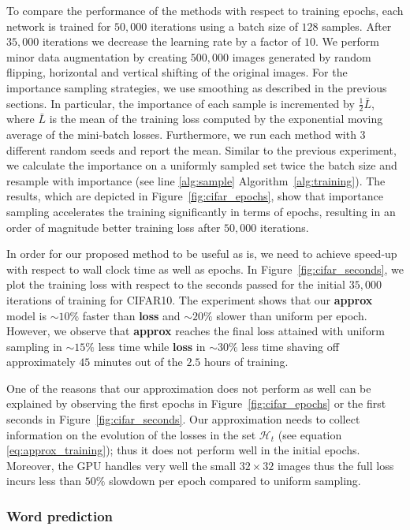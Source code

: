 \documentclass{article}
\begin{document}
To compare the performance of the methods with respect to training epochs, each
network is trained for $50,000$ iterations using a batch size of $128$ samples.
After $35,000$ iterations we decrease the learning rate by a factor of $10$. We
perform minor data augmentation by creating $500,000$ images
generated by random flipping, horizontal and vertical shifting of the original
images. For the importance sampling strategies, we use smoothing as described
in the previous sections. In particular, the importance of each sample is
incremented by $\frac{1}{2} \bar{L}$, where $\bar{L}$ is the mean of the
training loss computed by the exponential moving average of the mini-batch
losses. Furthermore, we run each method with $3$ different random seeds and
report the mean. Similar to the previous experiment, we calculate the importance on a
uniformly sampled set twice the batch size and resample with importance (see
line \ref{alg:sample} Algorithm~\ref{alg:training}). The results, which are
depicted in Figure~\ref{fig:cifar_epochs}, show that importance sampling
accelerates the training significantly in terms of epochs, resulting in an
order of magnitude better training loss after $50,000$ iterations.

In order for our proposed method to be useful as is, we need to achieve
speed-up with respect to wall clock time as well as epochs. In
Figure~\ref{fig:cifar_seconds}, we plot the training loss with respect to the
seconds passed for the initial $35,000$ iterations of training for CIFAR10. The
experiment shows that our \textbf{approx} model is $\sim 10\%$ faster than
\textbf{loss} and $\sim 20\%$ slower than uniform per epoch. However, we
observe that \textbf{approx} reaches the final loss attained with uniform
sampling in $\sim 15\%$ less time while \textbf{loss} in $\sim 30\%$ less time
shaving off approximately $45$ minutes out of the $2.5$ hours of training.

One of the reasons that our approximation does not perform as well can be
explained by observing the first epochs in Figure~\ref{fig:cifar_epochs} or the
first seconds in Figure~\ref{fig:cifar_seconds}. Our approximation needs to
collect information on the evolution of the losses in the set $\mathcal{H}_t$
(see equation \ref{eq:approx_training}); thus it does not perform well in the
initial epochs. Moreover, the GPU handles very well the small $32\times32$
images thus the full loss incurs less than $50\%$ slowdown per epoch compared
to uniform sampling.

\subsubsection{Word prediction}
\end{document}
